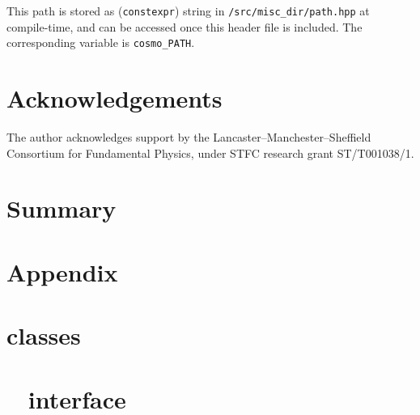 \documentclass[11pt,a4paper]{article}
\renewcommand{\theequation}{\arabic{section}.\arabic{equation}}
\begin{document}
This path is stored as ({\tt constexpr}) string in {\tt \nsc/src/misc\_dir/path.hpp} at compile-time, and can be accessed once this header file is included. The corresponding variable is {\tt cosmo\_PATH}.








\section{Acknowledgements}
%
The author acknowledges support by the Lancaster–Manchester–Sheffield Consortium for Fundamental Physics, under STFC research grant ST/T001038/1.


\section{Summary}


\setcounter{section}{0}
\section*{Appendix}
\appendix

\renewcommand{\theequation}{\Alph{section}.\arabic{equation}}
\setcounter{equation}{0}  %







\section{\CPP classes}\label{app:classes}
\setcounter{equation}{0}


\section{\nsc~  \PY interface}\label{app:modules}
\setcounter{equation}{0}
\end{document}
